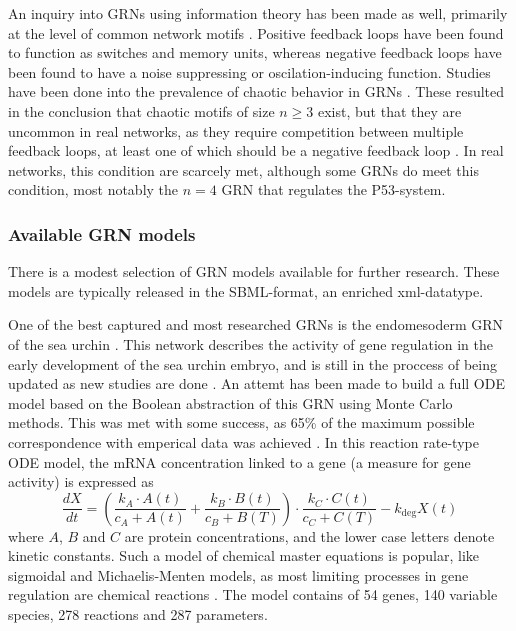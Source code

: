 \documentclass[../main.tex]{subfiles}
\begin{document}
An inquiry into GRNs using information theory has been made as well, primarily at the level of common network motifs \cite{zhang2012chaotic}.
Positive feedback loops have been found to function as switches and memory units, whereas negative feedback loops have been found to have a noise suppressing or oscilation-inducing function.
Studies have been done into the prevalence of chaotic behavior in GRNs \cite{zhang2012chaotic}.
These resulted in the conclusion that chaotic motifs of size $n\ge 3$ exist, but that they are uncommon in real networks, as they require competition between multiple feedback loops, at least one of which should be a negative feedback loop \cite{zhang2012chaotic}.
In real networks, this condition are scarcely met, although some GRNs do meet this condition, most notably the $n=4$ GRN that regulates the P53-system.

\subsubsection{Available GRN models}

There is a modest selection of GRN models available for further research.
These models are typically released in the SBML-format, an enriched xml-datatype.

One of the best captured and most researched GRNs is the endomesoderm GRN of the sea urchin \cite{bolouri2002modeling, kuhn2009monte}.
This network describes the activity of gene regulation in the early development of the sea urchin embryo, and is still in the proccess of being updated as new studies are done \cite{urchinmodel}.
An attemt has been made to build a full ODE model based on the Boolean abstraction of this GRN using Monte Carlo methods.
This was met with some success, as 65\% of the maximum possible correspondence with emperical data was achieved \cite{kuhn2009monte}.
In this reaction rate-type ODE model, the mRNA concentration linked to a gene (a measure for gene activity) is expressed as
%
\begin{equation}
\frac{dX}{dt} = (\frac{k_A \cdot A(t)}{c_A + A(t)} + \frac{k_B \cdot B(t)}{c_B + B(T)}) \cdot \frac{k_C \cdot C(t)}{c_C + C(T)} - k_\mathrm{deg} X(t)
\end{equation}
%
where $A$, $B$ and $C$ are protein concentrations, and the lower case letters denote kinetic constants.
Such a model of chemical master equations is popular, like sigmoidal and Michaelis-Menten models, as most limiting processes in gene regulation are chemical reactions \cite{aijo2009learning}.
The model contains of 54 genes, 140 variable species, 278 reactions and 287 parameters.
\end{document}

